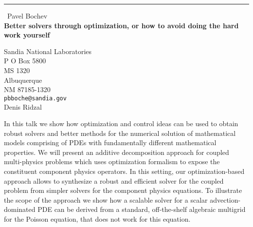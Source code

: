 \documentclass{report}
\begin{document}
\begin{center}
\rule{6in}{1pt} \
{\large Pavel Bochev \\
{\bf Better solvers through optimization, or how to avoid doing the hard work yourself}}

Sandia National Laboratories \\ P O Box 5800 \\ MS 1320 \\ Albuquerque \\ NM 87185-1320
\\
{\tt pbboche@sandia.gov}\\
Denis Ridzal\end{center}

In this talk we show how optimization and control ideas can be used to
obtain robust solvers and better methods for the numerical solution of
mathematical models comprising of PDEs with fundamentally different
mathematical properties. We will present an additive decomposition
approach for coupled multi-physics problems which uses optimization
formalism to expose the constituent component physics operators. In this
setting, our optimization-based approach allows to synthesize a robust
and efficient solver for the coupled problem from simpler solvers for the
component physics equations. To illustrate the scope of the approach we
show how a scalable solver for a scalar advection-dominated PDE can be
derived from a standard, off-the-shelf algebraic multigrid for the
Poisson equation, that does not work for this equation.
\end{document}
